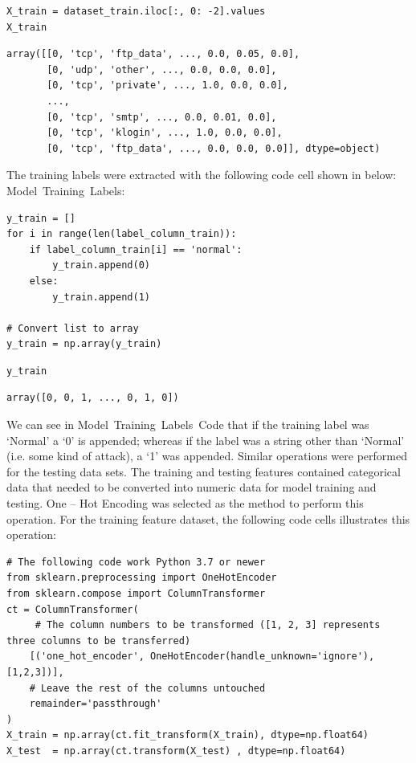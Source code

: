\begin{verbatim}
X_train = dataset_train.iloc[:, 0: -2].values
X_train
\end{verbatim}

\begin{verbatim}
array([[0, 'tcp', 'ftp_data', ..., 0.0, 0.05, 0.0],
       [0, 'udp', 'other', ..., 0.0, 0.0, 0.0],
       [0, 'tcp', 'private', ..., 1.0, 0.0, 0.0],
       ...,
       [0, 'tcp', 'smtp', ..., 0.0, 0.01, 0.0],
       [0, 'tcp', 'klogin', ..., 1.0, 0.0, 0.0],
       [0, 'tcp', 'ftp_data', ..., 0.0, 0.0, 0.0]], dtype=object)
\end{verbatim}

The training labels were extracted with the following code cell shown in below: Model~Training~Labels:

\begin{verbatim}
y_train = []
for i in range(len(label_column_train)):
    if label_column_train[i] == 'normal':
        y_train.append(0)
    else:
        y_train.append(1)

# Convert list to array
y_train = np.array(y_train)
\end{verbatim}

\begin{verbatim}
y_train
\end{verbatim}

\begin{verbatim}
array([0, 0, 1, ..., 0, 1, 0])
\end{verbatim}

We can see in Model~Training~Labels~Code that if the training label was `Normal' a `0' is appended; whereas if the label was a string other than `Normal' (i.e. some kind of attack), a `1' was appended.  Similar operations were performed for the testing data sets.  The training and testing features contained categorical data that needed to be converted into numeric data for model training and testing.  One -- Hot Encoding was selected as the method to perform this operation.  For the training feature dataset, the following code cells illustrates this operation:

\begin{verbatim}
# The following code work Python 3.7 or newer
from sklearn.preprocessing import OneHotEncoder
from sklearn.compose import ColumnTransformer
ct = ColumnTransformer(
     # The column numbers to be transformed ([1, 2, 3] represents three columns to be transferred)
    [('one_hot_encoder', OneHotEncoder(handle_unknown='ignore'), [1,2,3])],
    # Leave the rest of the columns untouched
    remainder='passthrough'
)
X_train = np.array(ct.fit_transform(X_train), dtype=np.float64)
X_test  = np.array(ct.transform(X_test) , dtype=np.float64)
\end{verbatim}

